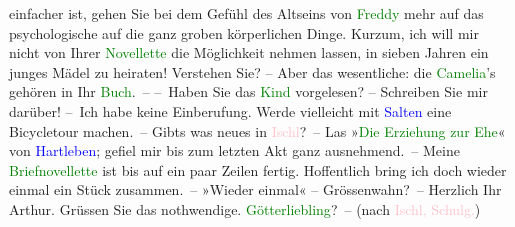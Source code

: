                einfacher ist, gehen Sie bei dem Gefühl des Altseins von \textcolor{green}{Freddy}{} mehr auf das psychologische \label{T_L00249_1v}\label{T_L00249_1h} auf die ganz groben
               körperlichen Dinge. Kurzum, ich will mir nicht von Ihrer \textcolor{green}{Novellette}{} die Möglichkeit nehmen lassen, in sieben Jahren
               ein junges Mädel zu heiraten! Verstehen Sie? – Aber das wesentliche: die \textcolor{green}{Camelia}{}\ledrightnote{\textcolor{green}{Camelias}}’s gehören in Ihr \textcolor{green}{Buch}{}. –\pend
           \pstart
           – Haben Sie das \textcolor{green}{Kind}{}\ledrightnote{\textcolor{green}{Das Kind}} vorgelesen? – Schreiben Sie
               mir darüber! – Ich habe keine Einberufung. Werde vielleicht mit \textcolor{blue}{Salten}{}\ledrightnote{\textcolor{blue}{Felix Salten}} eine Bicycletour machen. –\pend
           \pstart
           Gibts was neues in \textcolor{pink}{Ischl}{}\ledrightnote{\textcolor{pink}{Bad Ischl}}? –\pend
           \pstart
           Las »\textcolor{green}{Die Erziehung zur Ehe}{}\ledrightnote{\textcolor{green}{Die Erziehung zur Ehe}}« von \textcolor{blue}{Hartleben}{}\ledrightnote{\textcolor{blue}{Otto Erich Hartleben}}; gefiel mir bis zum letzten Akt ganz
               ausnehmend. –\pend
           \pstart
           Meine \textcolor{green}{Briefnovellette}{} ist bis auf
               ein paar Zeilen fertig. Hoffentlich bring ich doch wieder einmal ein Stück
               zusammen. –\pend
           \pstart
           »Wieder einmal« – Grössenwahn? –\pend
           \pstart Herzlich Ihr \spacefill\mbox{Arthur.}\pend{}\pstart
           \noindent{}Grüssen Sie das nothwendige. \textcolor{green}{Götterliebling}{}\ledrightnote{\textcolor{green}{Der Tod Georgs}}? –\pend
           \pstart
           (nach \textcolor{pink}{Ischl, Schulg.}{}\ledrightnote{\textcolor{pink}{Schulgasse}})\pend
           \endnumbering{}  
      